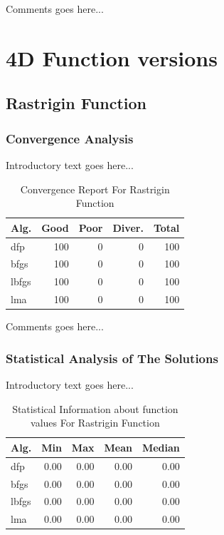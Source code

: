 \documentclass{ieeeaccess}
\begin{document}
Comments goes here...

\section{4D Function versions}
\label{functions4D}

\subsection{Rastrigin Function}
\label{rastrigin4d4D}

\subsubsection{Convergence Analysis}
\label{convergencerastrigin4d4D}


Introductory text goes here...
\begin{table}
\centering
\caption{Convergence Report For Rastrigin Function}
\label{convergence:rastrigin4d}
\begin{tabular}{lrrrr}
\toprule
 Alg. &  Good &  Poor &  Diver. &  Total \\
\midrule
  dfp &   100 &     0 &       0 &    100 \\
 bfgs &   100 &     0 &       0 &    100 \\
lbfgs &   100 &     0 &       0 &    100 \\
  lma &   100 &     0 &       0 &    100 \\
\bottomrule
\end{tabular}
\end{table}


Comments goes here...
\subsubsection{Statistical Analysis of The Solutions}
\label{statisticalanalysisrastrigin4d4D}


Introductory text goes here...
\begin{table}
\centering
\caption{Statistical Information about function values For Rastrigin Function}
\label{function_values:rastrigin4d}
\begin{tabular}{lrrrr}
\toprule
 Alg. &  Min &  Max &  Mean &  Median \\
\midrule
  dfp & 0.00 & 0.00 &  0.00 &    0.00 \\
 bfgs & 0.00 & 0.00 &  0.00 &    0.00 \\
lbfgs & 0.00 & 0.00 &  0.00 &    0.00 \\
  lma & 0.00 & 0.00 &  0.00 &    0.00 \\
\bottomrule
\end{tabular}
\end{table}
\end{document}
